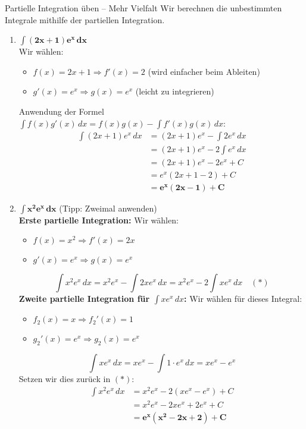 \begin{loesungsumgebung}{Partielle Integration üben – Mehr Vielfalt}
Wir berechnen die unbestimmten Integrale mithilfe der partiellen Integration.

\begin{enumerate}[label=(\alph*)]
    \item $\mathbf{\int (2x+1)e^x \,dx}$ \\
    Wir wählen:
    \begin{itemize}
        \item $f(x) = 2x+1 \Rightarrow f'(x) = 2$ (wird einfacher beim Ableiten)
        \item $g'(x) = e^x \Rightarrow g(x) = e^x$ (leicht zu integrieren)
    \end{itemize}
    Anwendung der Formel $\int f(x)g'(x) \,dx = f(x)g(x) - \int f'(x)g(x) \,dx$:
    \begin{align*} \int (2x+1)e^x \,dx &= (2x+1)e^x - \int 2e^x \,dx \\ &= (2x+1)e^x - 2\int e^x \,dx \\ &= (2x+1)e^x - 2e^x + C \\ &= e^x(2x+1-2) + C \\ &= \mathbf{e^x(2x-1) + C} \end{align*}

    \item $\mathbf{\int x^2 e^x \,dx}$ (Tipp: Zweimal anwenden) \\
    \textbf{Erste partielle Integration:}
    Wir wählen:
    \begin{itemize}
        \item $f(x) = x^2 \Rightarrow f'(x) = 2x$
        \item $g'(x) = e^x \Rightarrow g(x) = e^x$
    \end{itemize}
    $$ \int x^2 e^x \,dx = x^2e^x - \int 2x e^x \,dx = x^2e^x - 2 \int x e^x \,dx \quad (*) $$
    \textbf{Zweite partielle Integration für $\int x e^x \,dx$:}
    Wir wählen für dieses Integral:
    \begin{itemize}
        \item $f_2(x) = x \Rightarrow f_2'(x) = 1$
        \item $g_2'(x) = e^x \Rightarrow g_2(x) = e^x$
    \end{itemize}
    $$ \int x e^x \,dx = xe^x - \int 1 \cdot e^x \,dx = xe^x - e^x $$
    Setzen wir dies zurück in $(*)$:
    \begin{align*} \int x^2 e^x \,dx &= x^2e^x - 2(xe^x - e^x) + C \\ &= x^2e^x - 2xe^x + 2e^x + C \\ &= \mathbf{e^x(x^2 - 2x + 2) + C} \end{align*}


\end{enumerate}
\end{loesungsumgebung}
